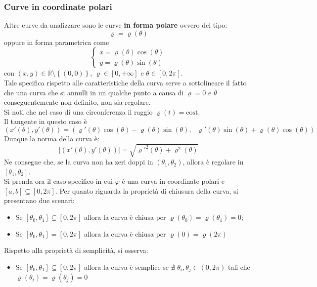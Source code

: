 \subsubsection{Curve in coordinate polari}
    Altre curve da analizzare sono le curve \textbf{in forma polare} ovvero del tipo:
    \begin{equation}
        \varrho=\varrho(\theta) 
    \end{equation}
    oppure in forma parametrica come 
    \begin{equation}
        \begin{cases}
            x=\varrho(\theta)\cos(\theta)\\
            y=\varrho(\theta)\sin(\theta)
        \end{cases}
    \end{equation}
    con $(x,y) \in \mathbb{R}\setminus \left\{(0,0)\right\}$, $\varrho \in \left[0, +\infty\right]$ e $\theta \in \left[0, 2\pi\right]$.\\
    Tale specifica rispetto alle caratteristiche della curva serve a sottolineare il fatto che una curva che si annulli in un qualche punto a causa di $\varrho=0$ e $\theta$ conseguentemente non definito, non sia regolare.\\
    Si noti che nel caso di una circonferenza il raggio $\varrho(t)=\text{cost}$.\\
    Il tangente in questo caso è
    \begin{equation}
        (x'(\theta), y'(\theta))=(\varrho'(\theta)\cos(\theta)-\varrho(\theta)\sin(\theta), \text{ } \varrho'(\theta)\sin(\theta)+\varrho(\theta)\cos(\theta))
    \end{equation}
    Dunque la norma della curva è:
    \begin{equation}
        |(x'(\theta), y'(\theta))|=\sqrt{\varrho'^2(\theta)+\varrho^2(\theta)}
    \end{equation} 
    Ne consegue che, se la curva non ha zeri doppi in $\left(\theta_1, \theta_2\right)$, allora è regolare in $\left[\theta_1, \theta_2\right]$.\\
    Si prenda ora il caso specifico in cui $\varphi$ è una curva in coordinate polari e $[a,b] \subseteq [0, 2\pi]$.
    Per quanto riguarda la proprietà di chiusura della curva, si presentano due scenari: 
    \begin{itemize}
        \item Se $[\theta_0, \theta_1] \subsetneq [0, 2\pi]$ allora la curva è chiusa per $\varrho(\theta_0)=\varrho(\theta_1)=0$;
        \item Se $[\theta_0, \theta_1]=[0, 2\pi]$ allora la curva è chiusa per $\varrho(0)=\varrho(2\pi)$
    \end{itemize}
    Rispetto alla proprietà di semplicità, si osserva:
    \begin{itemize}
        \item Se $[\theta_0, \theta_1] \subseteq [0, 2\pi]$ allora la curva è semplice se $\nexists$ $\theta_i, \theta_j \in (0,2\pi)$ tali che $\varrho(\theta_i)=\varrho(\theta_j)=0$
    \end{itemize}
